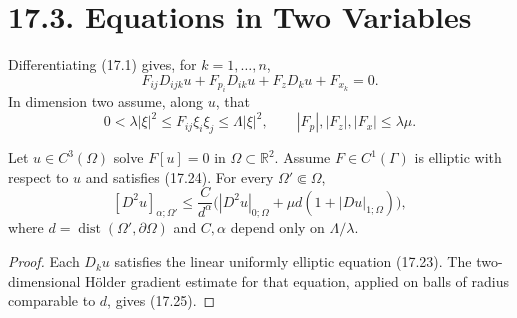 \section*{17.3. Equations in Two Variables}

Differentiating (17.1) gives, for $k=1,\ldots,n$,
\begin{equation}\tag{17.23}
F_{ij}D_{ijk}u+F_{p_i}D_{ik}u+F_zD_ku+F_{x_k}=0.
\end{equation}
In dimension two assume, along $u$, that
\begin{equation}\tag{17.24}
0<\lambda|\xi|^2\le F_{ij}\xi_i\xi_j\le\Lambda|\xi|^2,
\qquad |F_p|,|F_z|,|F_x|\le\lambda\mu.
\end{equation}

\begin{theorem}
\label{gt-ch17-thm-interior-hessian-holder-two-dimensional}
Let $u\in C^3(\Omega)$ solve $F[u]=0$ in $\Omega\subset\mathbb R^2$.
Assume $F\in C^1(\Gamma)$ is elliptic with respect to $u$ and satisfies
(17.24).  For every $\Omega'\Subset\Omega$,
\begin{equation}\tag{17.25}
[D^2u]_{\alpha;\Omega'}\le\frac{C}{d^\alpha}
\bigl(|D^2u|_{0;\Omega}+\mu d(1+|Du|_{1;\Omega})\bigr),
\end{equation}
where $d=\operatorname{dist}(\Omega',\partial\Omega)$ and $C,\alpha$ depend
only on $\Lambda/\lambda$.
\end{theorem}
\begin{proof}
\sketch Each $D_ku$ satisfies the linear uniformly elliptic equation (17.23).
The two-dimensional H\"older gradient estimate for that equation, applied on
balls of radius comparable to $d$, gives (17.25).
\end{proof}

